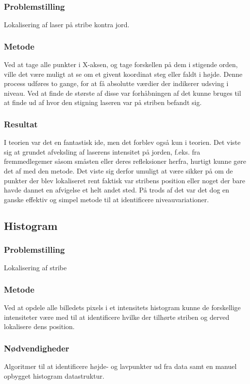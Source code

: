 \subsubsection{Problemstilling}
Lokalisering af laser på stribe kontra jord.

\subsubsection{Metode}
Ved at tage alle punkter i X-aksen, og tage forskellen på dem i stigende orden, ville det være muligt at se om et givent koordinat steg eller faldt i højde.
Denne process udføres to gange, for at få absolutte værdier der indikerer udsving i niveau. Ved at finde de største af disse var forhåbningen af det kunne bruges til at finde ud af hvor den stigning laseren var på striben befandt sig.

\subsubsection{Resultat}
I teorien var det en fantastisk ide, men det forblev også kun i teorien. Det viste sig at grundet afveksling af laserens intensitet på jorden, f.eks. fra fremmedlegemer såsom småsten eller deres refleksioner herfra, hurtigt kunne gøre det af med den metode.
Det viste sig derfor umuligt at være sikker på om de punkter der blev lokaliseret rent faktisk var stribens position eller noget der bare havde dannet en afvigelse et helt andet sted.
På trods af det var det dog en ganske effektiv og simpel metode til at identificere niveauvariationer.

\subsection{Histogram}

\subsubsection{Problemstilling}
Lokalisering af stribe

\subsubsection{Metode}
Ved at opdele alle billedets pixels i et intensitets histogram kunne de forskellige intensiteter være med til at identificere hvilke der tilhørte striben og derved lokalisere dens position.

\subsubsection{Nødvendigheder}
Algoritmer til at identificere højde- og lavpunkter ud fra data samt en manuel opbygget histogram datastruktur.

